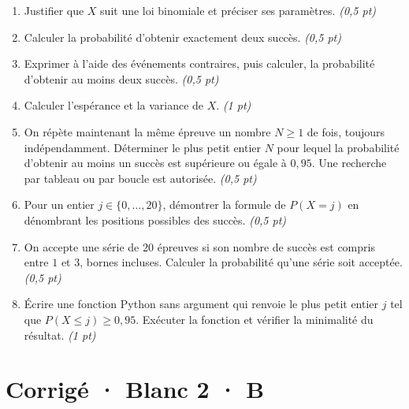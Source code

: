 \begin{enumerate}

\item Justifier que $X$ suit une loi binomiale et préciser ses paramètres. \hfill\textit{(0,5 pt)}

\item Calculer la probabilité d'obtenir exactement deux succès. \hfill\textit{(0,5 pt)}

\item Exprimer à l'aide des événements contraires, puis calculer, la probabilité d'obtenir au moins deux succès. \hfill\textit{(0,5 pt)}

\item Calculer l'espérance et la variance de $X$. \hfill\textit{(1 pt)}

\item On répète maintenant la même épreuve un nombre $N\ge1$ de fois, toujours indépendamment. Déterminer le plus petit entier $N$ pour lequel la probabilité d'obtenir au moins un succès est supérieure ou égale à $0{,}95$. Une recherche par tableau ou par boucle est autorisée. \hfill\textit{(0,5 pt)}

\item Pour un entier $j\in\{0,\ldots,20\}$, démontrer la formule de $P(X=j)$ en dénombrant les positions possibles des succès. \hfill\textit{(0,5 pt)}

\item On accepte une série de $20$ épreuves si son nombre de succès est compris entre $1$ et $3$, bornes incluses. Calculer la probabilité qu'une série soit acceptée. \hfill\textit{(0,5 pt)}

\item Écrire une fonction Python sans argument qui renvoie le plus petit entier $j$ tel que $P(X\le j)\ge0{,}95$. Exécuter la fonction et vérifier la minimalité du résultat. \hfill\textit{(1 pt)}

\end{enumerate}

\ifprof\clearpage

\section*{Corrigé · Blanc 2 · B}\label{cor:8-4}

